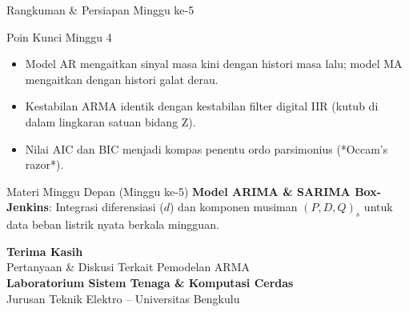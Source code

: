 \documentclass[aspectratio=169, 10pt]{beamer}
\begin{document}
\begin{frame}{Rangkuman \& Persiapan Minggu ke-5}
    \begin{block}{Poin Kunci Minggu 4}
        \begin{itemize}
            \item Model AR mengaitkan sinyal masa kini dengan histori masa lalu; model MA mengaitkan dengan histori galat derau.
            \item Kestabilan ARMA identik dengan kestabilan filter digital IIR (kutub di dalam lingkaran satuan bidang Z).
            \item Nilai AIC dan BIC menjadi kompas penentu ordo parsimonius (*Occam's razor*).
        \end{itemize}
    \end{block}
    \vspace{0.2cm}
    \begin{alertblock}{Materi Minggu Depan (Minggu ke-5)}
        \textbf{Model ARIMA \& SARIMA Box-Jenkins}: Integrasi diferensiasi ($d$) dan komponen musiman $(P,D,Q)_s$ untuk data beban listrik nyata berkala mingguan.
    \end{alertblock}
\end{frame}

\begin{frame}[plain]
    \begin{center}
        \vspace{1.5cm}
        {\Huge \color{mainblue} \textbf{Terima Kasih}}\\[0.4cm]
        {\large Pertanyaan \& Diskusi Terkait Pemodelan ARMA}\\[1.2cm]
        \textbf{Laboratorium Sistem Tenaga \& Komputasi Cerdas}\\
        Jurusan Teknik Elektro -- Universitas Bengkulu
    \end{center}
\end{frame}
\end{document}

